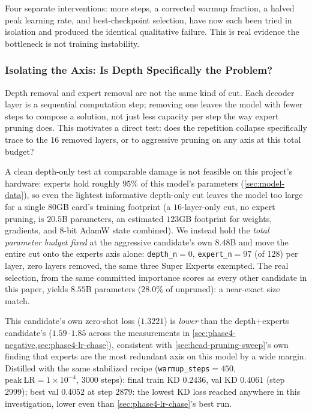 \documentclass{article}
\theoremstyle{plain}
\theoremstyle{definition}
\theoremstyle{remark}
\begin{document}
Four separate interventions: more steps, a corrected warmup fraction,
a halved peak learning rate, and best-checkpoint selection, have now
each been tried in isolation and produced the identical qualitative
failure. This is real evidence the bottleneck is not training
instability.

\subsubsection{Isolating the Axis: Is Depth Specifically the Problem?}
\label{sec:phase4-depth-isolation}

Depth removal and expert removal are not the same kind of cut. Each
decoder layer is a sequential computation step; removing one leaves the
model with fewer steps to compose a solution, not just less capacity per
step the way expert pruning does. This motivates a direct test: does the
repetition collapse specifically trace to the $16$ removed layers, or to
aggressive pruning on any axis at this total budget?

A clean depth-only test at comparable damage is not feasible on this
project's hardware: experts hold roughly $95\%$ of this model's
parameters (\cref{sec:model-data}), so even the lightest informative
depth-only cut leaves the model too large for a single 80GB card's
training footprint (a $16$-layer-only cut, no expert pruning, is
$20.5$B parameters, an estimated $123$GB footprint for weights,
gradients, and 8-bit AdamW state combined). We instead hold the
\emph{total parameter budget fixed} at the aggressive candidate's own
$8.48$B and move the entire cut onto the experts axis alone:
\texttt{depth\_n}$=0$, \texttt{expert\_n}$=97$ (of 128) per layer, zero
layers removed, the same three Super Experts exempted. The real
selection, from the same committed importance scores as every other
candidate in this paper, yields $8.55$B parameters ($28.0\%$ of
unpruned): a near-exact size match.

This candidate's own zero-shot loss ($1.3221$) is \emph{lower} than the
depth+experts candidate's ($1.59$--$1.85$ across the measurements in
\cref{sec:phase4-negative,sec:phase4-lr-chase}), consistent with
\cref{sec:head-pruning-sweep}'s own finding that experts are the most
redundant axis on this model by a wide margin. Distilled with the same
stabilized recipe (\texttt{warmup\_steps}$=450$,
$\mathrm{peak\ LR}=1\times10^{-4}$, 3000 steps): final train KD
$0.2436$, val KD $0.4061$ (step 2999); best val $0.4052$ at step
$2879$: the lowest KD loss reached anywhere in this investigation,
lower even than \cref{sec:phase4-lr-chase}'s best run.
\end{document}

